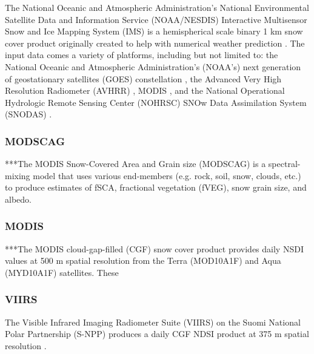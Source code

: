 The National Oceanic and Atmospheric Administration’s National Environmental Satellite Data and Information Service (NOAA/NESDIS) Interactive Multisensor Snow and Ice Mapping System (IMS) is a hemispherical scale binary 1 km snow cover product originally created to help with numerical weather prediction 
\citep{ramsayInteractiveMultisensorSnow1998, helfrichEnhancementsForthcomingDevelopments2007}. The input data comes a variety of platforms, including but not limited to: the National Oceanic and Atmospheric Administration's (NOAA's) next generation of geostationary satellites (GOES) constellation \citep{menzelIntroducingGOESIFirst1994}, the Advanced Very High Resolution Radiometer (AVHRR) \citep{cracknellAdvancedVeryHigh1997}, MODIS \citep{salomonsonMODISAdvancedFacility1989}, and the National Operational Hydrologic Remote Sensing Center (NOHRSC) SNOw Data Assimilation System (SNODAS) \citep{barrettandrewNationalOperationalHydrologic2003}.

\hypertarget{ch4-methods-4}{\subsubsection{MODSCAG}\label{ch4-methods-4}}


***The MODIS Snow-Covered Area and Grain size (MODSCAG) \citep{painterRetrievalSubpixelSnow2009} is a spectral-mixing model that uses various end-members (e.g. rock, soil, snow, clouds, etc.) to produce estimates of fSCA, fractional vegetation (fVEG), snow grain size, and albedo.


\hypertarget{ch4-methods-5}{\subsubsection{MODIS}\label{ch4-methods-5}}

***The MODIS cloud-gap-filled (CGF) snow cover product \citep{hallEvaluationMODISVIIRS2019} provides daily NSDI values at 500 m spatial resolution from the Terra (MOD10A1F) and Aqua (MYD10A1F) satellites. These


\hypertarget{ch4-methods-6}{\subsubsection{VIIRS}\label{ch4-methods-6}}

The Visible Infrared Imaging Radiometer Suite (VIIRS) on the Suomi National Polar Partnership (S-NPP) produces a daily CGF NDSI product at 375 m spatial resolution \citep{hallEvaluationMODISVIIRS2019}.


